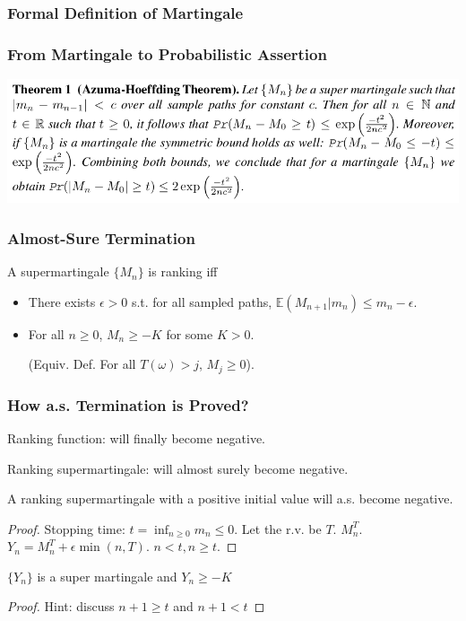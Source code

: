 \documentclass[11pt]{beamer}
\begin{document}
\begin{frame}\frametitle{Formal Definition of Martingale}



\end{frame}

\begin{frame}\frametitle{From Martingale to Probabilistic Assertion}

\begin{center}
\includegraphics[scale=0.35]{azuma.png}
\end{center}

\end{frame}

\begin{frame}\frametitle{Almost-Sure Termination}

\begin{definition}

A supermartingale $\{M_n\}$ is ranking iff
\begin{itemize}
\item There exists $\epsilon > 0$ s.t. for all sampled paths, $\mathbb{E}(M_{n+1}|m_n) \le m_n - \epsilon$.

\item For all $n\ge 0$, $M_n \ge -K$ for some $K >0$. 

(Equiv. Def. For all $T(\omega) > j$, $M_j\ge 0$).
\end{itemize}
\end{definition}
\end{frame}

\begin{frame}\frametitle{How a.s. Termination is Proved?}
Ranking function: will finally become negative.

Ranking supermartingale: will almost surely become negative.
\pause
\begin{theorem}
A ranking supermartingale with a positive initial value will a.s. become negative.
\end{theorem}
\pause
\begin{proof}
Stopping time: $t = \inf_{n\ge 0} m_n\le 0$. Let the r.v. be $T$.
$M_{n}^{T}$. 
$Y_n = M_{n}^{T} + \epsilon\min(n,T)$.
$n < t, n \ge t$.
\end{proof}
\pause
\begin{lemma}
$\{Y_n\}$ is a super martingale and $Y_n \ge -K$
\end{lemma}
\begin{proof}
Hint: discuss $n+1 \ge t$ and $n+1 < t$
\end{proof}

\end{frame}
\end{document}
